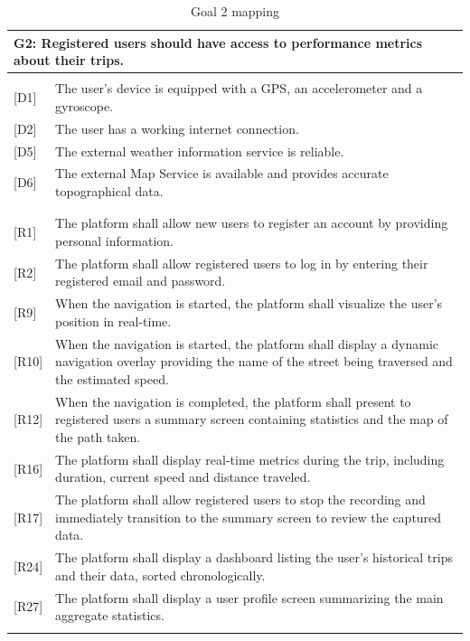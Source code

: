 \newpage
\begin{table}[H]
    \centering
    \renewcommand{\arraystretch}{1.5}
    
    \begin{tabularx}{\textwidth}{|l X|}
        \hline
        \multicolumn{2}{|l|}{\textbf{G2}: Registered users should have access to performance metrics about their trips.} \\
        \hline
        & \\[-1em] %
        
        {[D1]} & The user’s device is equipped with a GPS, an accelerometer and a gyroscope. \\
        {[D2]} & The user has a working internet connection. \\
        {[D5]} & The external weather information service is reliable. \\
        {[D6]} & The external Map Service is available and provides accurate topographical data.\\
        & \\
        \hline
        & \\[-1em]
        
        {[R1]} & The platform shall allow new users to register an account by providing personal information. \\
        {[R2]} & The platform shall allow registered users to log in by entering their registered email and password. \\
        {[R9]} & When the navigation is started, the platform shall visualize the user's position in real-time.\\
        {[R10]} & When the navigation is started, the platform shall display a dynamic navigation overlay providing the name of the street being traversed and the estimated speed. \\
        {[R12]} & When the navigation is completed, the platform shall present to registered users a summary screen containing statistics and the map of the path taken. \\
        {[R16]} & The platform shall display real-time metrics during the trip, including duration, current speed and
distance traveled. \\
        {[R17]} & The platform shall allow registered users to stop the recording and immediately transition to the summary screen to review the captured data. \\
        {[R24]} & The platform shall display a dashboard listing the user’s historical trips and their data, sorted chronologically.\\
        {[R27]} & The platform shall display a user profile screen summarizing the main aggregate statistics. \\
        & \\
        \hline
    \end{tabularx}
    \caption{Goal 2 mapping}
\end{table}


